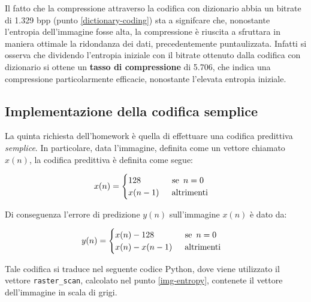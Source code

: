 Il fatto che la compressione attraverso la codifica con dizionario abbia un bitrate di 1.329 bpp (punto \ref{dictionary-coding}) sta a signifcare che, nonostante l'entropia dell'immagine fosse alta, la compressione è riuscita a sfruttara in maniera ottimale la ridondanza dei dati, precedentemente puntaulizzata. Infatti si osserva che dividendo l'entropia iniziale con il bitrate ottenuto dalla codifica con dizionario si ottene un \textbf{tasso di compressione} di 5.706, che indica una compressione particolarmente efficacie, nonostante l'elevata entropia iniziale.



\vspace{15px}\subsection{Implementazione della codifica semplice}\label{simple-coding}
La quinta richiesta dell'homework è quella di effettuare una codifica predittiva \textsl{semplice}. In particolare, data l'immagine, definita come un vettore chiamato $x(n)$, la codifica predittiva è definita come segue:

\begin{gather*}
    x(n) = 
    \begin{cases}
        128 \hspace{37px} \text{se } \, n = 0 \\
        x(n - 1) \hspace{15px} \text{altrimenti}\\
    \end{cases}
\end{gather*}

\noindent Di conseguenza l'errore di predizione $y(n)$ sull'immagine $x(n)$ è dato da:

\begin{gather*}
    y(n) = 
    \begin{cases}
        x(n) - 128 \hspace{37px} \text{se } \, n = 0 \\
        x(n) - x(n - 1) \hspace{15px} \text{altrimenti}\\
    \end{cases}
\end{gather*}

\noindent Tale codifica si traduce nel seguente codice Python, dove viene utilizzato il vettore \texttt{raster\_scan}, calcolato nel punto \ref{img-entropy}, contenete il vettore dell'immagine in scala di grigi.


